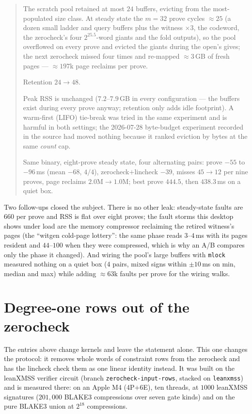 \documentclass[11pt]{article}
\newcommand{\code}[1]{\texttt{#1}}
\newenvironment{optsummary}{%
  \begin{quote}\small
  \begin{description}
  \setlength{\itemsep}{1pt}\setlength{\parsep}{0pt}\setlength{\topsep}{2pt}
}{%
  \end{description}
  \end{quote}
}
\begin{document}
\begin{optsummary}
\item[Baseline:] The scratch pool retained at most $24$ buffers, evicting from the most-populated size class. At steady state the $m{=}32$ prove cycles $\approx25$ (a dozen small ladder and query buffers plus the witness $\times3$, the codeword, the zerocheck's four $2^{25.5}$-word giants and the fold outputs), so the pool overflowed on every prove and evicted the giants during the open's gives; the next zerocheck missed four times and re-mapped $\approx3\,$GB of fresh pages --- $\approx197$k page reclaims per prove.
\item[Improvement:] Retention $24\to48$.
\item[Mechanism:] Peak RSS is unchanged ($7.2$--$7.9\,$GB in every configuration --- the buffers exist during every prove anyway; retention only adds idle footprint). A warm-first (LIFO) tie-break was tried in the same experiment and is harmful in both settings; the 2026-07-28 byte-budget experiment recorded in the source had moved nothing because it ranked eviction by bytes at the same \emph{count} cap.
\item[Result:] Same binary, eight-prove steady state, four alternating pairs: prove $-55$ to $-96\,$ms (mean $-68$, $4/4$), zerocheck$+$lincheck $-39$, misses $45\to12$ per nine proves, page reclaims $2.0$M$\to1.0$M; best prove $444.5$, then $438.3\,$ms on a quiet box.
\end{optsummary}

Two follow-ups closed the subject. There is no other leak: steady-state
faults are $660$ per prove and RSS is flat over eight proves; the
fault storms this desktop shows under load are the memory compressor
reclaiming the retired witness's pages (the ``witgen cold-page
lottery'': the same phase reads $3$--$4\,$ms with its pages resident and
$44$--$100$ when they were compressed, which is why an A/B compares only
the phase it changed). And wiring the pool's large buffers with
\code{mlock} measured nothing on a quiet box ($4$ pairs, mixed signs
within $\pm10\,$ms on min, median and max) while adding $\approx63$k
faults per prove for the wiring walks.

\section{Degree-one rows out of the zerocheck}\label{sec:degreeone}

The entries above change kernels and leave the statement alone. This one
changes the protocol: it removes whole words of constraint rows from the
zerocheck and has the lincheck check them as one linear identity instead.
It was built on the leanXMSS verifier circuit (branch
\code{zerocheck-input-rows}, stacked on \code{leanxmss}) and is
measured there: on an Apple M4 (4P$+$6E), ten threads, at $1000$ leanXMSS
signatures ($201{,}000$ BLAKE3 compressions over seven gate kinds) and on
the pure BLAKE3 union at $2^{18}$ compressions.
\end{document}
